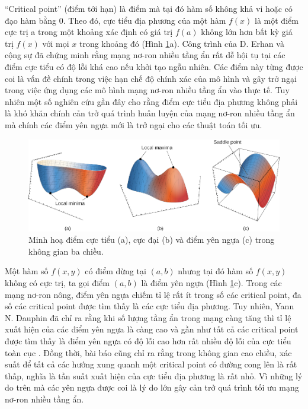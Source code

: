 ``Critical point'' (điểm tới hạn) là điểm mà tại đó hàm số không khả vi hoặc có đạo hàm bằng 0. Theo đó, cực tiểu địa phương của một hàm $f(x)$ là một điểm cực trị a trong một khoảng xác định có giá trị $f(a)$ không lớn hơn bất kỳ giá trị $f(x)$ với mọi $x$ trong khoảng đó (Hình \ref{fig:minimas}a). Công trình của D. Erhan và cộng sự\cite{erhan2009thedifficulty} đã chứng minh rằng mạng nơ-ron nhiều tầng ẩn rất dễ hội tụ tại các điểm cực tiểu có độ lỗi khá cao nếu khởi tạo ngẫu nhiên. Các điểm này từng được coi là vấn đề chính trong việc hạn chế độ chính xác của mô hình và gây trở ngại trong việc ứng dụng các mô hình mạng nơ-ron nhiều tầng ẩn vào thực tế. Tuy nhiên một số nghiên cứu gần đây cho rằng điểm cực tiểu địa phương không phải là khó khăn chính cản trở quá trình huấn luyện của mạng nơ-ron nhiều tầng ẩn mà chính các điểm yên ngựa mới là trở ngại cho các thuật toán tối ưu\cite{dauphin2014identifying}.

\begin{figure}[htp]
\centering
\includegraphics[width=120 mm]{images/minimas.png}
\caption{Minh hoạ điểm cực tiểu (a), cực đại (b) và điểm yên ngựa (c) trong không gian ba chiều.}
\label{fig:minimas}
\end{figure}

Một hàm số $f(x,y)$ có điểm dừng tại $(a,b)$ nhưng tại đó hàm số $f(x,y)$ không có cực trị, ta gọi điểm $(a,b)$ là điểm yên ngựa (Hình \ref{fig:minimas}c). Trong các mạng nơ-ron nông, điểm yên ngựa chiếm tỉ lệ rất ít trong số các critical point, đa số các critical point được tìm thấy là các cực tiểu địa phương. Tuy nhiên, Yann N. Dauphin đã chỉ ra rằng khi số lượng tầng ẩn trong mạng càng tăng thì tỉ lệ xuất hiện của các điểm yên ngựa là càng cao và gần như tất cả các critical point được tìm thấy là điểm yên ngựa có độ lỗi cao hơn rất nhiều độ lỗi của cực tiểu toàn cục \cite{dauphin2014identifying}. Đồng thời, bài báo cũng chỉ ra rằng trong không gian cao chiều, xác suất để tất cả các hướng xung quanh một critical point có đường cong lên là rất thấp, nghĩa là tần suất xuất hiện của cực tiểu địa phương là rất nhỏ. Vì những lý do trên mà các yên ngựa được coi là lý do lớn gây cản trở quá trình tối ưu mạng nơ-ron nhiều tầng ẩn.

